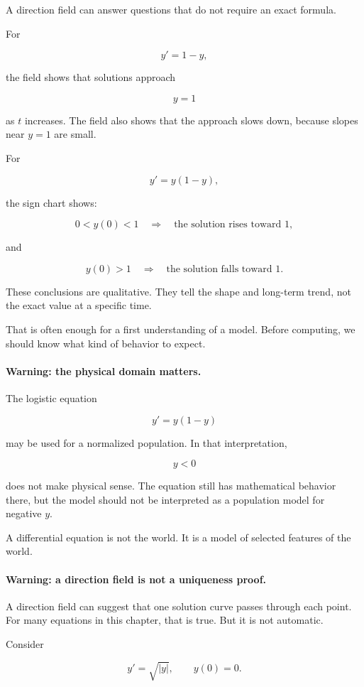 A direction field can answer questions that do not require an exact formula.

For

\[
y'=1-y,
\]

the field shows that solutions approach

\[
y=1
\]

as \(t\) increases.  The field also shows that the approach slows down, because slopes
near \(y=1\) are small.

For

\[
y'=y(1-y),
\]

the sign chart shows:

\[
0<y(0)<1
\quad\Longrightarrow\quad
\text{the solution rises toward }1,
\]

and

\[
y(0)>1
\quad\Longrightarrow\quad
\text{the solution falls toward }1.
\]

These conclusions are qualitative.  They tell the shape and long-term trend, not the
exact value at a specific time.

That is often enough for a first understanding of a model.  Before computing, we should
know what kind of behavior to expect.

\paragraph{Warning: the physical domain matters.}
The logistic equation

\[
y'=y(1-y)
\]

may be used for a normalized population.  In that interpretation,

\[
y<0
\]

does not make physical sense.  The equation still has mathematical behavior there, but
the model should not be interpreted as a population model for negative \(y\).

A differential equation is not the world.  It is a model of selected features of the world.

\paragraph{Warning: a direction field is not a uniqueness proof.}
A direction field can suggest that one solution curve passes through each point.  For
many equations in this chapter, that is true.  But it is not automatic.

Consider

\[
y'=\sqrt{|y|},
\qquad
y(0)=0.
\]

